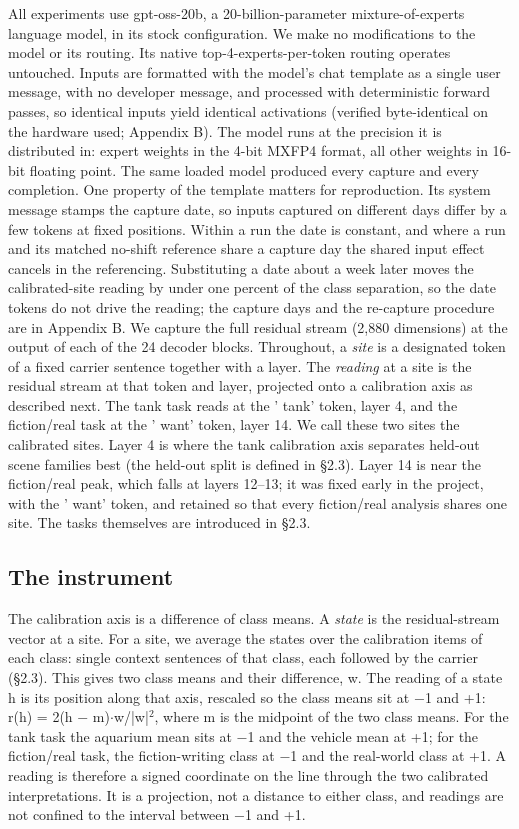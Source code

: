 \documentclass[11pt]{article}
\begin{document}
All experiments use gpt-oss-20b, a 20-billion-parameter mixture-of-experts language
model, in its stock configuration. We make no modifications to the model or its
routing. Its native top-4-experts-per-token routing operates untouched. Inputs are formatted with the model's chat template as a single user message, with
no developer message, and processed with deterministic forward passes, so identical inputs yield identical
activations (verified byte-identical on the hardware used; Appendix B). The model runs at the precision it is distributed
in: expert weights in the 4-bit MXFP4 format, all other weights in 16-bit floating
point. The same loaded model produced every capture and every completion. One property of the template matters for reproduction. Its system message stamps the capture date, so inputs captured on different days differ by a few tokens at fixed positions. Within a run the date is constant, and where a run and its matched no-shift reference share a capture day the shared input effect cancels in the referencing. Substituting a date about a week later moves the calibrated-site reading by under one percent of the class separation, so the date tokens do not drive the reading; the capture days and the re-capture procedure are in Appendix B. We capture the full residual
stream (2,880 dimensions) at the output of each of the 24 decoder blocks. Throughout, a
\emph{site} is a designated token of a fixed carrier sentence together with a layer. The
\emph{reading} at a site is the residual stream at that token and layer, projected onto a
calibration axis as described next. The tank task reads at the ' tank' token, layer 4, and the fiction/real task at the
' want' token, layer 14. We call these two sites the calibrated sites. Layer 4 is where the tank
calibration axis separates held-out scene families best (the held-out split is
defined in \S2.3). Layer 14 is near the fiction/real peak, which falls at layers 12–13; it was fixed
early in the project, with the ' want' token, and retained so that every fiction/real
analysis shares one site. The tasks themselves are introduced in \S2.3.

\subsection{The instrument}

The calibration axis is a difference of class means. A \emph{state} is the residual-stream
vector at a site. For a site, we average the states over the calibration items of each
class: single context sentences of that class, each followed by the carrier (\S2.3). This gives two class means
and their difference, w. The reading of a state h is its position along that axis,
rescaled so the class means sit at $-$1 and +1: r(h) = 2(h $-$ m)$\cdot$w/|w|$^{2}$, where m is the
midpoint of the two class means. For the tank task the aquarium mean sits at $-$1 and the
vehicle mean at +1; for the fiction/real task, the fiction-writing class at $-$1 and the real-world class at +1. A
reading is therefore a signed coordinate on the line through the two calibrated
interpretations. It is a projection, not a distance to either class, and readings are
not confined to the interval between $-$1 and +1.
\end{document}
